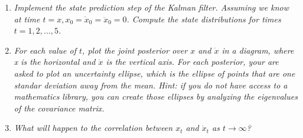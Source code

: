 \documentclass[10pt]{article}
\begin{document}
\begin{enumerate}
\begin{enumerate}
\item \textit{Implement the state prediction step of the Kalman filter. Assuming
  we know at time $t=x, x_0 = \dot{x}_0 = \ddot{x}_0 = 0$. Compute the state
distributions for times $t=1,2,...,5$.}

\item \textit{For each value of $t$, plot the joint posterior over $x$ and
  $\dot{x}$ in a diagram, where x is the horizontal and $\dot{x}$ is the
vertical axis. For each posterior, your are asked to plot an uncertainty
ellipse, which is the ellipse of points that are one standar deviation away from
the mean. Hint: if you do not have access to a mathematics library, you can
create those ellipses by analyzing the eigenvalues of the covariance matrix.}

\item \textit{What will happen to the correlation between $x_t$ and $\dot{x}_t$
  as $t\to \infty$?}
  \end{enumerate}

\end{enumerate}
\end{document}

